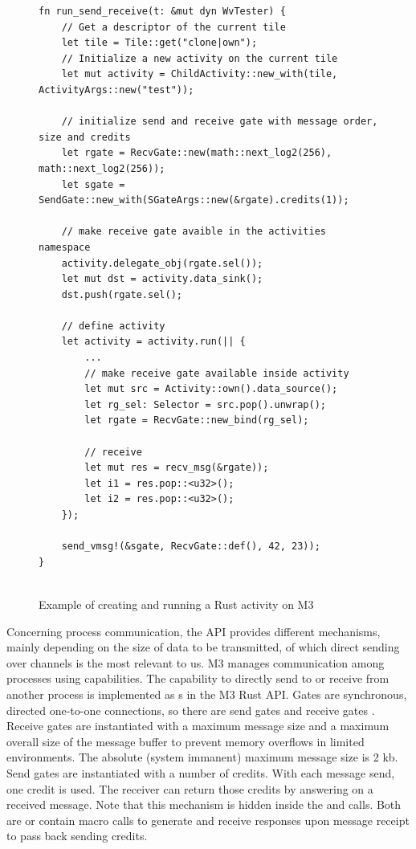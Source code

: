 \begin{figure}
    \centering
    \begin{verbatim}
fn run_send_receive(t: &mut dyn WvTester) {
    // Get a descriptor of the current tile
    let tile = Tile::get("clone|own");
    // Initialize a new activity on the current tile
    let mut activity = ChildActivity::new_with(tile, ActivityArgs::new("test"));

    // initialize send and receive gate with message order, size and credits 
    let rgate = RecvGate::new(math::next_log2(256), math::next_log2(256));
    let sgate = SendGate::new_with(SGateArgs::new(&rgate).credits(1));

    // make receive gate avaible in the activities namespace
    activity.delegate_obj(rgate.sel());
    let mut dst = activity.data_sink();
    dst.push(rgate.sel();

    // define activity 
    let activity = activity.run(|| {
        ...
        // make receive gate available inside activity
        let mut src = Activity::own().data_source();
        let rg_sel: Selector = src.pop().unwrap();
        let rgate = RecvGate::new_bind(rg_sel);

        // receive 
        let mut res = recv_msg(&rgate));
        let i1 = res.pop::<u32>();
        let i2 = res.pop::<u32>();
    });

    send_vmsg!(&sgate, RecvGate::def(), 42, 23));
}
    
    \end{verbatim}
    \caption{Example of creating and running a Rust activity on M3}
    \label{fig:startingActivity}
\end{figure}

Concerning process communication, the API provides different mechanisms, mainly depending on the size of data to be transmitted, of which direct sending over channels is the most relevant to us. M3 manages communication among processes using capabilities. The capability to directly send to or receive from another process is implemented as s in the M3 Rust API. Gates are synchronous, directed one-to-one connections, so there are send gates  and receive gates . Receive gates are instantiated with a maximum message size and a maximum overall size of the message buffer to prevent memory overflows in limited environments. The absolute (system immanent) maximum message size is 2 kb. Send gates are instantiated with a number of credits. With each message send, one credit is used. The receiver can return those credits by answering on a received message. Note that this mechanism is hidden inside the  and  calls. Both are or contain macro calls to generate and receive responses upon message receipt to pass back sending credits. \\

